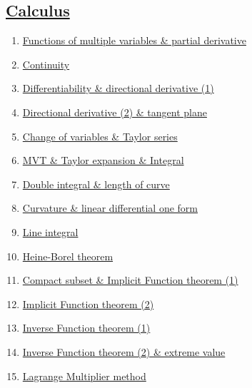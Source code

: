 \documentclass[11pt]{article}
\begin{document}
\subsection*{\href{https://www.youtube.com/playlist?list=PLVJXJebpO4Pi_4cETi8EL19qJLdcLEW2a&si=YwWo1F4e-o_KZ5_s}{Calculus }}

\vspace{-0.5cm}

\begin{enumerate}
	\item \href{https://mp.weixin.qq.com/s/bDhkUEZvMhreRqtfUtJLig}{Functions of multiple variables \& partial derivative}	%
	\item \href{https://mp.weixin.qq.com/s/kUzP7n_yHdNj4tn9Fty6-g}{Continuity}	%
	\item \href{https://mp.weixin.qq.com/s/AZ5YUhzyy--ws_s9xAGWeg}{Differentiability \& directional derivative (1)}	%
	\item \href{https://mp.weixin.qq.com/s/tOC1mEdZZttDdqHmah9Zqg}{Directional derivative (2) \& tangent plane}	%
	\item \href{https://mp.weixin.qq.com/s/mFU23KZzCUmfhEvfXL7_Rg}{Change of variables \& Taylor series}	%
	\item \href{https://mp.weixin.qq.com/s/JgYEAfJC-5psD7MIrfqgvQ}{MVT \& Taylor expansion \& Integral}	%
	\item \href{https://mp.weixin.qq.com/s/N1_45wIPGIKQRxs9qTMC4A}{Double integral \& length of curve}	%
	\item \href{https://mp.weixin.qq.com/s/Q2oLh8mb3pF3DAJkWp9tqA}{Curvature \& linear differential one form}	%
	\item \href{https://mp.weixin.qq.com/s/11utINvjKpiv_-qE25NnsQ}{Line integral}	%
	\item \href{https://mp.weixin.qq.com/s/pDquAXZJGuAhIiO5f5yn2A}{Heine-Borel theorem}	%
	\item \href{https://mp.weixin.qq.com/s/dar5eiTVv9u0cnkM3nfmLA}{Compact subset \& Implicit Function theorem (1)}	%
	\item \href{https://mp.weixin.qq.com/s/_JQb_vYCM8oyltC8NYS69A}{Implicit Function theorem (2)}	%
	\item \href{https://mp.weixin.qq.com/s/C1ruVdkOUj0u68DExiO9bw}{Inverse Function theorem (1)}	%
	\item \href{https://mp.weixin.qq.com/s/vuSw-YiioZSat0vNSduJzg}{Inverse Function theorem (2) \& extreme value}	%
	\item \href{https://mp.weixin.qq.com/s/FnIgRSTFcAOGlAtICzfXvA}{Lagrange Multiplier method}	%

\end{enumerate}
\end{document}

